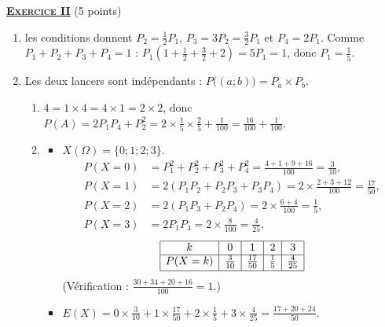 \noindent \underline{\textsc{\textbf{Exercice II}}} (5 points)
	\begin{enumerate}
		\item {}
			les conditions donnent $P_2 = \frac{1}{2}P_1$, $P_3 = 3P_2 = \frac{3}{2}P_1$ et $P_4 = 2P_1$.
			Comme $P_1 + P_2 + P_3 + P_4 = 1$ : $P_1\left(1 + \frac{1}{2} + \frac{3}{2} + 2\right) = 5P_1 = 1$, donc $P_1 = \frac{1}{5}$.

		\item Les deux lancers sont indépendants : $P\big((a;b)\big) = P_a\times P_b$.
			\begin{enumerate}
				\item {} $4 = 1\times4 = 4\times1 = 2\times2$, donc
					$P(A) = 2P_1P_4 + P_2^2 = 2\times\frac{1}{5}\times\frac{2}{5} + \frac{1}{100} = \frac{16}{100} + \frac{1}{100}$.

				\item \begin{itemize}
					\item {} $X(\Omega) = \{0;1;2;3\}$.
						\begin{align*}
							P(X=0) &= P_1^2 + P_2^2 + P_3^2 + P_4^2 = \tfrac{4 + 1 + 9 + 16}{100} = \tfrac{3}{10}, \\
							P(X=1) &= 2\left(P_1P_2 + P_2P_3 + P_3P_4\right) = 2\times\tfrac{2 + 3 + 12}{100} = \tfrac{17}{50}, \\
							P(X=2) &= 2\left(P_1P_3 + P_2P_4\right) = 2\times\tfrac{6 + 4}{100} = \tfrac{1}{5}, \\
							P(X=3) &= 2P_1P_4 = 2\times\tfrac{8}{100} = \tfrac{4}{25}.
						\end{align*}
						\[
						\begin{array}{|c|c|c|c|c|}
							\hline
							k & 0 & 1 & 2 & 3 \\ \hline
							P(X=k) & \frac{3}{10} & \frac{17}{50} & \frac{1}{5} & \frac{4}{25} \\[.5ex] \hline
						\end{array}
						\]
						(Vérification : $\frac{30 + 34 + 20 + 16}{100} = 1$.)
					\item {} $E(X) = 0\times\frac{3}{10} + 1\times\frac{17}{50} + 2\times\frac{1}{5} + 3\times\frac{4}{25} = \frac{17 + 20 + 24}{50}$.


\end{itemize}
\end{enumerate}
\end{enumerate}
